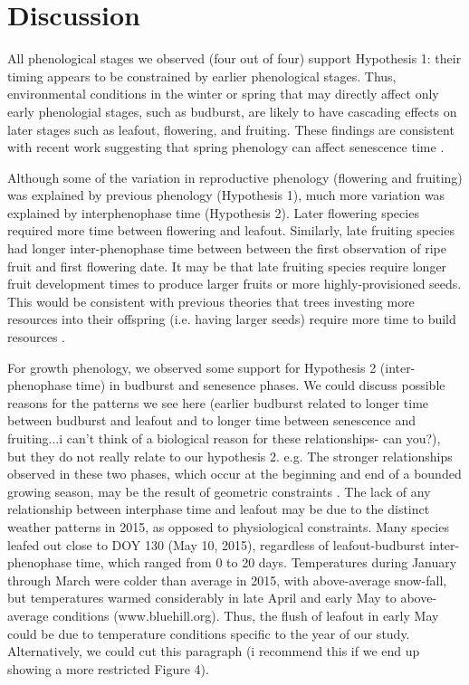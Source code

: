\documentclass{article}
\begin{document}
\section* {Discussion}
\par All phenological stages we observed (four out of four) support Hypothesis 1: their timing appears to be constrained by earlier phenological stages. Thus, environmental conditions in the winter or spring that may directly affect only early phenologial stages, such as budburst, are likely to have cascading effects on later stages such as leafout, flowering, and fruiting. These findings are consistent with recent work suggesting that spring phenology can affect senescence time \citep {keenan2015}. 

\par Although some of the variation in reproductive phenology (flowering and fruiting) was explained by previous phenology (Hypothesis 1), much more variation was explained by interphenophase time (Hypothesis 2). Later flowering species required more time between flowering and leafout. Similarly, late fruiting species had longer inter-phenophase time between between the first observation of ripe fruit and first flowering date. It may be that late fruiting species require longer fruit development times to produce larger fruits or more highly-provisioned seeds. This would be consistent with previous theories that trees investing more resources into their offspring (i.e. having larger seeds) require more time to build resources \citep {bolmgren2008,sun2011}.

\par For growth phenology, we observed some support for Hypothesis 2 (inter-phenophase time) in budburst and senesence phases. We could discuss possible reasons for the patterns we see here (earlier budburst related to longer time between budburst and leafout and to longer time between senescence and fruiting...i can't think of a biological reason for these relationships- can you?), but they do not really relate to our hypothesis 2.  e.g. The stronger relationships observed in these two phases, which occur at the beginning and end of a bounded growing season, may be the result of geometric constraints \citep{letten2013}. The lack of any relationship between interphase time and leafout may be due to the distinct weather patterns in 2015, as opposed to physiological constraints. Many species leafed out close to DOY 130 (May 10, 2015), regardless of leafout-budburst inter-phenophase time, which ranged from 0 to 20 days. Temperatures during January through March were colder than average in 2015, with above-average snow-fall, but temperatures warmed considerably in late April and early May to above-average conditions (www.bluehill.org). Thus, the flush of leafout in early May could be due to temperature conditions specific to the year of our study. Alternatively, we could cut this paragraph (i recommend this if we end up showing a more restricted Figure 4).
\end{document}
